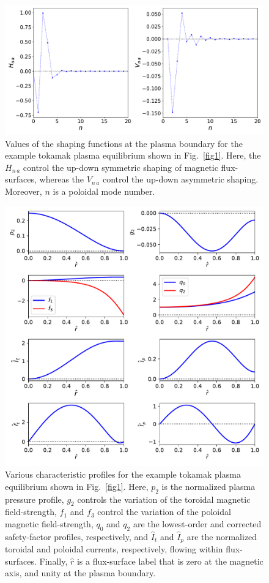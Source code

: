 \documentclass[12pt,prb,aps]{revtex4-1}
\begin{document}
\begin{figure}
\centerline{\includegraphics[width=\textwidth]{Figure2.pdf}}
\caption{Values of the shaping functions at the plasma boundary for the example tokamak plasma equilibrium shown in Fig.~\ref{fig1}.
Here, the $H_{n\,a}$ control the up-down symmetric shaping of magnetic flux-surfaces, whereas the $V_{n\,a}$ control the up-down
asymmetric shaping. Moreover, $n$ is a poloidal mode number.}\label{fig2}
\end{figure}

\begin{figure}
\centerline{\includegraphics[width=\textwidth]{Figure3.pdf}}
\caption{Various characteristic profiles for the example tokamak plasma equilibrium shown in Fig.~\ref{fig1}.
Here, $p_2$ is the normalized plasma pressure profile, $g_2$ controls the variation of the toroidal magnetic
field-strength, $f_1$ and $f_3$ control the variation of the poloidal magnetic field-strength, $q_0$ and $q_2$ are the
lowest-order and corrected safety-factor profiles, respectively,  and $\hat{I}_t$ and $\hat{I}_p$ are the
normalized toroidal and poloidal currents, respectively, flowing within flux-surfaces. Finally, $\hat{r}$ is
a flux-surface label that is zero at the magnetic axis, and unity at the plasma boundary. }\label{fig3}
\end{figure}
\end{document}

